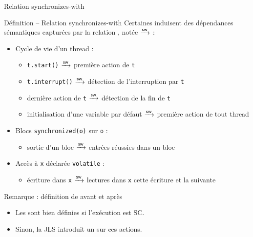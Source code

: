 
\begingroup

\begin{frame}{Relation synchronizes-with}

  \begin{block}{Définition -- Relation synchronizes-with}
    Certaines  induisent des \alert{dépendances sémantiques} capturées par la relation , notée $\xrightarrow{\mathsf{sw}}$ :
    \begin{itemize}
    \item Cycle de vie d'un thread :
      \begin{itemize}
      \item \lstinline{t.start()} $\xrightarrow{\mathsf{sw}}$ première action de \lstinline{t}
      \item \lstinline{t.interrupt()} $\xrightarrow{\mathsf{sw}}$ détection de l'interruption par \lstinline{t}
      \item dernière action de \lstinline{t} $\xrightarrow{\mathsf{sw}}$ détection de la fin de \lstinline{t}
      \item initialisation d'une variable par défaut $\xrightarrow{\mathsf{sw}}$ première action de tout thread
      \end{itemize}
    \item Blocs \lstinline{synchronized(o)} sur  \lstinline{o} :
      \begin{itemize}
      \item sortie d'un bloc $\xrightarrow{\mathsf{sw}}$ entrées  réussies dans un bloc
      \end{itemize}
    \item Accès à  \lstinline{x} déclarée \lstinline{volatile} :
      \begin{itemize}
      \item écriture dans \lstinline{x} $\xrightarrow{\mathsf{sw}}$ lectures dans \lstinline{x}  cette écriture et  la suivante
      \end{itemize}
    \end{itemize}
  \end{block}

  \pause

  \begin{block}{Remarque : définition de avant et après}
    \begin{itemize}
    \item Les  sont bien définies si l'exécution est \alert{SC}.
    \item Sinon, la JLS introduit un  sur ces actions.
    \end{itemize}
  \end{block}

\end{frame}

\endgroup
\endinput
